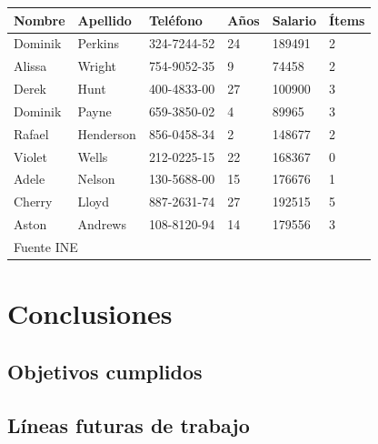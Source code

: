 \documentclass[12pt]{report} %
\begin{document}
\lipsum[5-7]	

\begin{table} [h]
	{\begin{tabular}{|p{1.75cm}|p{2cm}|p{2.5cm}|p{1.5cm}|p{2.5cm}|p{1.5cm}|}
		\hline
		\rowcolor{gray75}	
		Nombre & Apellido & Teléfono & Años & Salario & Ítems \\
		\hline 
		Dominik & Perkins & 324-7244-52 & 24 & 189491 & 2 \\
		\hline
		Alissa & Wright & 754-9052-35 & 9 & 74458 & 2 \\
		\hline
		Derek & Hunt & 400-4833-00 & 27 & 100900 & 3 \\
		\hline
		Dominik & Payne & 659-3850-02 & 4 & 89965 & 3 \\
		\hline
		Rafael & Henderson & 856-0458-34 & 2 & 148677 & 2 \\
		\hline
		Violet & Wells & 212-0225-15 & 22 & 168367 & 0\\
		\hline
		Adele & Nelson & 130-5688-00 & 15 & 176676 & 1 \\
		\hline
		Cherry & Lloyd & 887-2631-74 & 27 & 192515 & 5 \\
		\hline
		Aston & Andrews & 108-8120-94 & 14 & 179556 & 3 \\
		\hline
		\multicolumn{6}{|l|}{Fuente INE} \\
		\hline
	\end{tabular}}
\end{table}

\lipsum[6]

\chapter{Conclusiones}

\section{Objetivos cumplidos}
\lipsum[15-16]

\section{Líneas futuras de trabajo}
\lipsum[12-13]

	


\nocite{*} %
\end{document}

